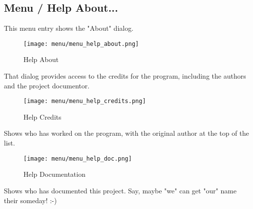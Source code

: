 \subsection{Menu / Help About...}
\label{subsec:seq24_menu_about}

   This menu entry shows the "About" dialog.

\begin{figure}[H]
   \centering 
   \texttt{[image: menu/menu\_help\_about.png]}
   \caption{Help About}
   \label{fig:seq24_menu_help_about}
\end{figure}

   That dialog provides access to the credits for the program, including the
   authors and the project documentor.

\begin{figure}[H]
   \centering 
   \texttt{[image: menu/menu\_help\_credits.png]}
   \caption{Help Credits}
   \label{fig:seq24_menu_help_credits}
\end{figure}

   Shows who has worked on the program, with the original author at the top
   of the list.

\begin{figure}[H]
   \centering 
   \texttt{[image: menu/menu\_help\_doc.png]}
   \caption{Help Documentation}
   \label{fig:seq24_menu_help_doc}
\end{figure}

   Shows who has documented this project.  Say, maybe "we" can get "our"
   name their someday!  :-)


